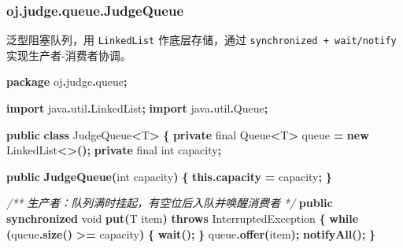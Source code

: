 \documentclass[
  11pt,
]{ctexart}
\newenvironment{Shaded}{\begin{snugshade}}{\end{snugshade}}
\newcommand{\BuiltInTok}[1]{#1}
\newcommand{\CommentTok}[1]{\textcolor[rgb]{0.56,0.35,0.01}{\textit{#1}}}
\newcommand{\ControlFlowTok}[1]{\textcolor[rgb]{0.13,0.29,0.53}{\textbf{#1}}}
\newcommand{\DataTypeTok}[1]{\textcolor[rgb]{0.13,0.29,0.53}{#1}}
\newcommand{\FunctionTok}[1]{\textcolor[rgb]{0.13,0.29,0.53}{\textbf{#1}}}
\newcommand{\ImportTok}[1]{#1}
\newcommand{\KeywordTok}[1]{\textcolor[rgb]{0.13,0.29,0.53}{\textbf{#1}}}
\newcommand{\NormalTok}[1]{#1}
\newcommand{\OperatorTok}[1]{\textcolor[rgb]{0.81,0.36,0.00}{\textbf{#1}}}
\begin{document}
\hypertarget{oj.judge.queue.judgequeue}{%
\subsubsection{oj.judge.queue.JudgeQueue}\label{oj.judge.queue.judgequeue}}

泛型阻塞队列，用 \texttt{LinkedList} 作底层存储，通过
\texttt{synchronized\ +\ wait/notify} 实现生产者-消费者协调。

\begin{Shaded}
\begin{Highlighting}[]
\KeywordTok{package}\ImportTok{ oj}\OperatorTok{.}\ImportTok{judge}\OperatorTok{.}\ImportTok{queue}\OperatorTok{;}

\KeywordTok{import} \ImportTok{java}\OperatorTok{.}\ImportTok{util}\OperatorTok{.}\ImportTok{LinkedList}\OperatorTok{;}
\KeywordTok{import} \ImportTok{java}\OperatorTok{.}\ImportTok{util}\OperatorTok{.}\ImportTok{Queue}\OperatorTok{;}

\KeywordTok{public} \KeywordTok{class}\NormalTok{ JudgeQueue}\OperatorTok{\textless{}}\NormalTok{T}\OperatorTok{\textgreater{}} \OperatorTok{\{}
    \KeywordTok{private} \DataTypeTok{final} \BuiltInTok{Queue}\OperatorTok{\textless{}}\NormalTok{T}\OperatorTok{\textgreater{}}\NormalTok{ queue }\OperatorTok{=} \KeywordTok{new} \BuiltInTok{LinkedList}\OperatorTok{\textless{}\textgreater{}();}
    \KeywordTok{private} \DataTypeTok{final} \DataTypeTok{int}\NormalTok{ capacity}\OperatorTok{;}

    \KeywordTok{public} \FunctionTok{JudgeQueue}\OperatorTok{(}\DataTypeTok{int}\NormalTok{ capacity}\OperatorTok{)} \OperatorTok{\{}
        \KeywordTok{this}\OperatorTok{.}\FunctionTok{capacity} \OperatorTok{=}\NormalTok{ capacity}\OperatorTok{;}
    \OperatorTok{\}}

    \CommentTok{/**} \CommentTok{生产者：队列满时挂起，有空位后入队并唤醒消费者} \CommentTok{*/}
    \KeywordTok{public} \KeywordTok{synchronized} \DataTypeTok{void} \FunctionTok{put}\OperatorTok{(}\NormalTok{T item}\OperatorTok{)} \KeywordTok{throws} \BuiltInTok{InterruptedException} \OperatorTok{\{}
        \ControlFlowTok{while} \OperatorTok{(}\NormalTok{queue}\OperatorTok{.}\FunctionTok{size}\OperatorTok{()} \OperatorTok{\textgreater{}=}\NormalTok{ capacity}\OperatorTok{)} \OperatorTok{\{}
            \FunctionTok{wait}\OperatorTok{();}
        \OperatorTok{\}}
\NormalTok{        queue}\OperatorTok{.}\FunctionTok{offer}\OperatorTok{(}\NormalTok{item}\OperatorTok{);}
        \FunctionTok{notifyAll}\OperatorTok{();}
    \OperatorTok{\}}


\end{Highlighting}
\end{Shaded}
\end{document}

